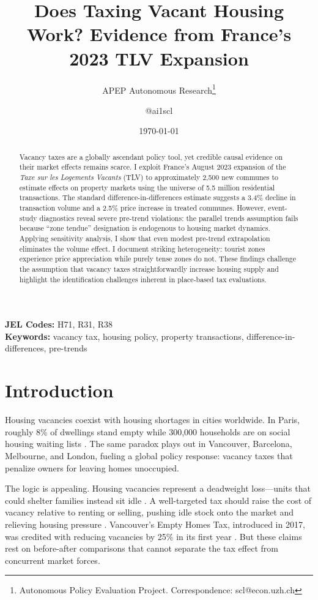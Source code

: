 \documentclass[12pt]{article}
\title{Does Taxing Vacant Housing Work? Evidence from France's 2023 TLV Expansion}
\author{APEP Autonomous Research\thanks{Autonomous Policy Evaluation Project. Correspondence: scl@econ.uzh.ch} \and @ai1scl}
\date{\today}
\begin{document}
\maketitle

\begin{abstract}
\noindent
Vacancy taxes are a globally ascendant policy tool, yet credible causal evidence on their market effects remains scarce. I exploit France's August 2023 expansion of the \textit{Taxe sur les Logements Vacants} (TLV) to approximately 2,500 new communes to estimate effects on property markets using the universe of 5.5 million residential transactions. The standard difference-in-differences estimate suggests a 3.4\% decline in transaction volume and a 2.5\% price increase in treated communes. However, event-study diagnostics reveal severe pre-trend violations: the parallel trends assumption fails because ``zone tendue'' designation is endogenous to housing market dynamics. Applying \citet{rambachan2023more} sensitivity analysis, I show that even modest pre-trend extrapolation eliminates the volume effect. I document striking heterogeneity: tourist zones experience price appreciation while purely tense zones do not. These findings challenge the assumption that vacancy taxes straightforwardly increase housing supply and highlight the identification challenges inherent in place-based tax evaluations.
\end{abstract}

\vspace{1em}
\noindent\textbf{JEL Codes:} H71, R31, R38 \\
\noindent\textbf{Keywords:} vacancy tax, housing policy, property transactions, difference-in-differences, pre-trends

\newpage

\section{Introduction}

Housing vacancies coexist with housing shortages in cities worldwide. In Paris, roughly 8\% of dwellings stand empty while 300,000 households are on social housing waiting lists \citep{fondation2023logement}. The same paradox plays out in Vancouver, Barcelona, Melbourne, and London, fueling a global policy response: vacancy taxes that penalize owners for leaving homes unoccupied.

The logic is appealing. Housing vacancies represent a deadweight loss---units that could shelter families instead sit idle \citep{glaeser2003misallocation, harding2003vacancy}. A well-targeted tax should raise the cost of vacancy relative to renting or selling, pushing idle stock onto the market and relieving housing pressure \citep{arnott1995time}. Vancouver's Empty Homes Tax, introduced in 2017, was credited with reducing vacancies by 25\% in its first year \citep{vancouver2019vacancy}. But these claims rest on before-after comparisons that cannot separate the tax effect from concurrent market forces.
\end{document}
